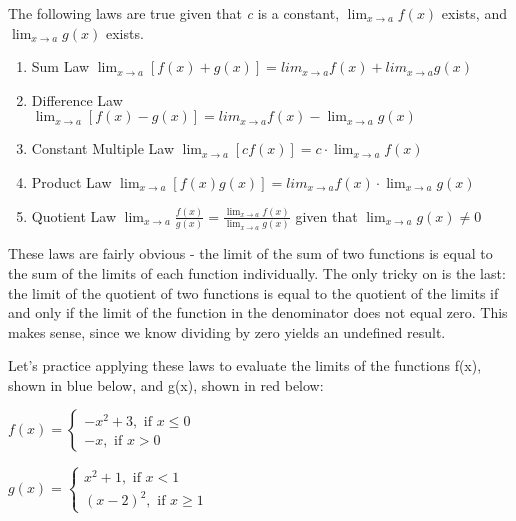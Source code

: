 The following laws are true given that \textit{c} is a constant, $\lim_{x\to a} 
f(x) $ exists, and $\lim_{x\to a} g(x) $ exists.

\begin{enumerate}
    \item Sum Law $\lim_{x\to a} \left[f(x) + g(x) \right] = lim_{x\to a} f(x) + lim_{x\to a} g(x)$
    \item Difference Law $\lim_{x\to a} \left[f(x) - g(x) \right] = lim_{x\to a} f(x) - \lim_{x\to a} g(x)$
    \item Constant Multiple Law $\lim_{x\to a} \left[\textit{c}f(x) \right] = \textit{c} \cdot \lim_{x\to a}    f(x) $
    \item Product Law $\lim_{x\to a} \left[f(x)g(x) \right] = lim_{x\to a}f(x) \cdot \lim_{x\to a} g(x)$
    \item Quotient Law $\lim_{x\to a} \frac{f(x)}{g(x)} = \frac{\lim_{x\to a} f(x)}{\lim_{x\to a} g(x)}$ given that $\lim_{x\to a} g(x) \neq 0$
\end{enumerate}
These laws are fairly obvious - the limit of the sum of two functions is equal to 
the sum of the limits of each function individually. The only tricky on is the 
last: the limit of the quotient of two functions is equal to the quotient of the 
limits if and only if the limit of the function in the denominator does not equal 
zero. This makes sense, since we know dividing by zero yields an undefined result. 

Let's practice applying these laws to evaluate the limits of the functions f(x), 
shown in blue below, and g(x), shown in red below:

$f(x) = \begin{cases}
    -x^2+3, \text{ if } x \leq 0\\
    -x, \text{ if } x > 0
\end{cases}$

$g(x) = \begin{cases}
   x^2+1, \text{ if } x < 1 \\
    (x-2)^2, \text{ if } x \geq 1
\end{cases}$

